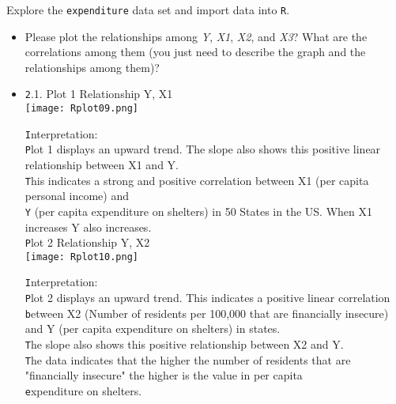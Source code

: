 \documentclass[12pt,letterpaper]{article}
\begin{document}
\vspace{.5cm}
\noindent Explore the \texttt{expenditure} data set and import data into \texttt{R}.
\vspace{.5cm}
  
\vspace{.5cm}
\begin{itemize}

\item 
Please plot the relationships among \emph{Y}, \emph{X1}, \emph{X2}, and \emph{X3}? What are the correlations among them (you just need to describe the graph and the relationships among them)?
\vspace{.5cm}
\item
    \texttt 2.1. Plot 1 Relationship Y, X1\\
    
	
	\texttt{[image: Rplot09.png]}
	
	\texttt Interpretation:\\
    \texttt Plot 1 displays an upward trend. The slope also shows this positive linear relationship between X1 and Y.\\
    \texttt This indicates a strong and positive correlation between X1 (per capita personal income) and\\ 
	\texttt Y (per capita expenditure on shelters) in 50 States in the US. When X1 increases Y also increases.\\   

	\texttt Plot 2  Relationship Y, X2\\
	

	\texttt{[image: Rplot10.png]}
	
	\texttt Interpretation:\\
	\texttt Plot 2 displays an upward trend. This indicates a positive linear correlation\\
	\texttt between X2 (Number of residents per 100,000 that are financially insecure) and Y (per capita expenditure on shelters) in states.\\ 
	\texttt The slope also shows this positive relationship between X2 and Y.\\ 
	\texttt The data indicates that the higher the number of residents that are "financially insecure" the higher is the value in per capita\\
	\texttt expenditure on shelters.\\
	

\end{itemize}
\end{document}
